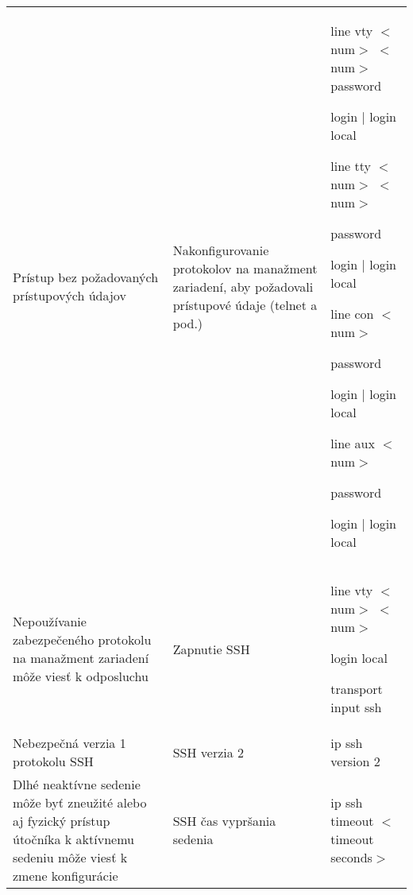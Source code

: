 \begin{longtable}[!htbp]{|L{10em}L{10em}>{\selectfont}L{34em}|}
	
	
	
	Prístup bez požadovaných prístupových údajov	&Nakonfigurovanie protokolov na manažment zariadení, aby požadovali prístupové údaje (telnet a pod.)	&line vty $<$num$>$ $<$num$>$
	\hspace{0.5em}password
	
	\hspace{0.5em}login | login local
	
	\vspace{0.5em}line tty $<$num$>$ $<$num$>$
	
	\hspace{0.5em}password
	
	\hspace{0.5em}login | login local
	
	\vspace{0.5em}
	line con $<$num$>$
	
	\hspace{0.5em}password
	
	\hspace{0.5em}login | login local
	
	\vspace{0.5em}line aux $<$num$>$
	
	\hspace{0.5em}password
	
	\hspace{0.5em}login | login local\\
	
	
	
	
	Nepoužívanie zabezpečeného protokolu na manažment zariadení môže viesť k odposluchu	&Zapnutie SSH	&line vty $<$num$>$ $<$num$>$
	
	\hspace{0.5em}login local
	
	\hspace{0.5em}transport input ssh\\
	
	
	
	Nebezpečná verzia 1 protokolu SSH	&SSH verzia 2	&ip ssh version 2\\
	
	
	
	
	Dlhé neaktívne sedenie môže byť zneužité alebo aj fyzický prístup útočníka k aktívnemu sedeniu môže viesť k zmene konfigurácie	&SSH čas vypršania sedenia	&ip ssh timeout $<$timeout seconds$>$\\
	
	
	

\end{longtable}
